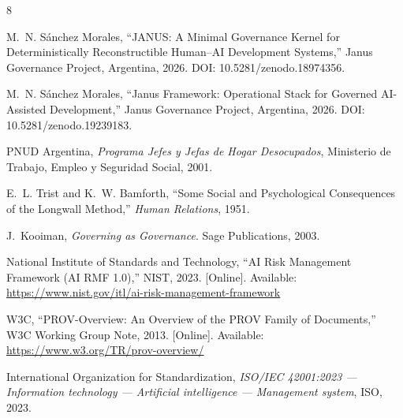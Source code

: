 \documentclass[conference]{IEEEtran}
\begin{document}
\begin{thebibliography}{8}

M.~N. Sánchez Morales, ``JANUS: A Minimal Governance Kernel for Deterministically Reconstructible Human--AI Development Systems,'' Janus Governance Project, Argentina, 2026. DOI: 10.5281/zenodo.18974356.

M.~N. Sánchez Morales, ``Janus Framework: Operational Stack for Governed AI-Assisted Development,'' Janus Governance Project, Argentina, 2026. DOI: 10.5281/zenodo.19239183.

PNUD Argentina, \emph{Programa Jefes y Jefas de Hogar Desocupados}, Ministerio de Trabajo, Empleo y Seguridad Social, 2001.

E.~L. Trist and K.~W. Bamforth, ``Some Social and Psychological Consequences of the Longwall Method,'' \emph{Human Relations}, 1951.

J.~Kooiman, \emph{Governing as Governance}. Sage Publications, 2003.

National Institute of Standards and Technology, ``AI Risk Management Framework (AI RMF 1.0),'' NIST, 2023. [Online]. Available: \url{https://www.nist.gov/itl/ai-risk-management-framework}

W3C, ``PROV-Overview: An Overview of the PROV Family of Documents,'' W3C Working Group Note, 2013. [Online]. Available: \url{https://www.w3.org/TR/prov-overview/}

International Organization for Standardization, \emph{ISO/IEC 42001:2023 --- Information technology --- Artificial intelligence --- Management system}, ISO, 2023.

\end{thebibliography}
\end{document}
